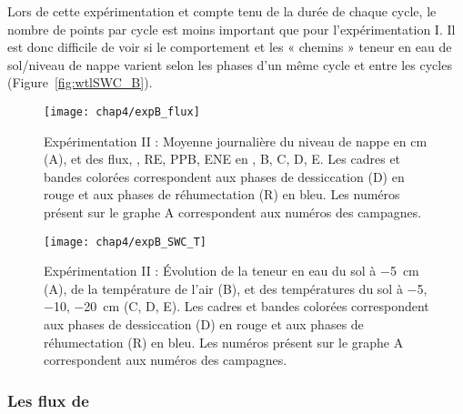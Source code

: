 Lors de cette expérimentation et compte tenu de la durée de chaque cycle, le nombre de points par cycle est moins important que pour l'expérimentation I.
Il est donc difficile de voir si le comportement et les « chemins » teneur en eau de sol/niveau de nappe varient selon les phases d'un même cycle et entre les cycles (Figure~\ref{fig:wtlSWC_B}).



\begin{figure}
\centering
\texttt{[image: chap4/expB\_flux]}
\caption{Expérimentation II : Moyenne journalière du niveau de nappe en cm (A), et des flux, \chh, RE, PPB, ENE en \si{\uml}, B, C, D, E. Les cadres et bandes colorées correspondent aux phases de dessiccation (D) en rouge et aux phases de réhumectation (R) en bleu. Les numéros présent sur le graphe A correspondent aux numéros des campagnes.}
\label{fig:HMty}
\end{figure}

\begin{figure}
\centering
\texttt{[image: chap4/expB\_SWC\_T]}
\caption{Expérimentation II : Évolution de la teneur en eau du sol à \SI{-5}{\centi\metre} (A), de la température de l'air (B), et des températures du sol à \num{-5}, \num{-10}, \SI{-20}{\centi\metre} (C, D, E). Les cadres et bandes colorées correspondent aux phases de dessiccation (D) en rouge et aux phases de réhumectation (R) en bleu. Les numéros présent sur le graphe A correspondent aux numéros des campagnes.}
\label{fig:HMty_T}
\end{figure}


\subsubsection{Les flux de \chh}


